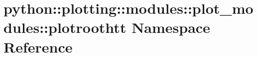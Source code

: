 \hypertarget{namespacepython_1_1plotting_1_1modules_1_1plot__modules_1_1plotroothtt}{
\section{python::plotting::modules::plot\_\-modules::plotroothtt Namespace Reference}
\label{namespacepython_1_1plotting_1_1modules_1_1plot__modules_1_1plotroothtt}
}

